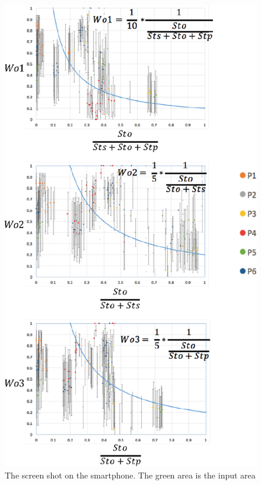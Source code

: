 \begin{figure}[!h]
\centering
\includegraphics[width=0.7\columnwidth]{img/weight_orientation.eps}
\caption{The screen shot on the smartphone. The green area is the input area}
\label{fig:weight_orientation}
\end{figure}

